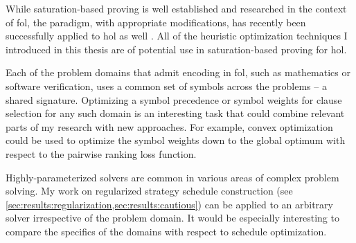 While saturation-based proving is well established and researched in the context of \gls{fol},
the paradigm, with appropriate modifications, has recently been successfully applied to \gls{hol} as well \cite{}.
All of the heuristic optimization techniques I introduced in this thesis are of potential use in saturation-based proving for \gls{hol}.

Each of the problem domains that admit encoding in \gls{fol},
such as mathematics or software verification,
uses a common set of symbols across the problems -- a shared signature.
Optimizing a symbol precedence or symbol weights for clause selection for any such domain is an interesting task that could combine relevant parts of my research with new approaches.
For example, convex optimization could be used to optimize the symbol weights down to the global optimum with respect to the pairwise ranking loss function.

Highly-parameterized solvers are common in various areas of complex problem solving.
My work on regularized strategy schedule construction (see \cref{sec:results:regularization,sec:results:cautious}) can be applied to an arbitrary solver irrespective of the problem domain.
It would be especially interesting to compare the specifics of the domains with respect to schedule optimization.
